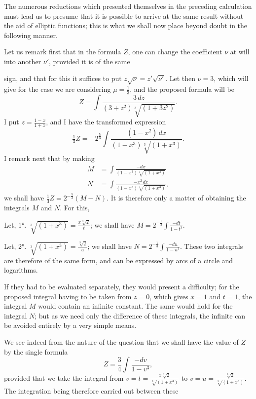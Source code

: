 \documentclass{article}
\begin{document}
The numerous reductions which presented themselves in the preceding calculation must lead us to presume that it is possible to arrive at the same result without the aid of elliptic functions; this is what we shall now place beyond doubt in the following manner.

Let us remark first that in the formula $Z$, one can change the coefficient $\nu$ at will into another $\nu'$, provided it is of the same

sign, and that for this it suffices to put $z\sqrt{\nu}=z'\sqrt{\nu'}$. Let then $\nu=3$, which will give for the case we are considering $\mu=\frac{1}{3}$, and the proposed formula will be
\[ Z=\int\frac{3\,dz}{(3+z^{2})\sqrt[3]{(1+3z^{2})}}. \]
I put $z=\frac{1-x}{1+x}$, and I have the transformed expression
\[ \tfrac{1}{3}Z=-2^{\frac{5}{3}}\int\frac{(1-x^{2})\,dx}{(1-x^{3})\sqrt[3]{(1+x^{3})}}. \]
I remark next that by making
\[ \begin{aligned} M&=\int\frac{-dx}{(1-x^{3})\sqrt[3]{(1+x^{3})}}\\ N&=\int\frac{-x^{2}\,dx}{(1-x^{3})\sqrt[3]{(1+x^{3})}}, \end{aligned} \]
we shall have $\frac{1}{3}Z=2^{-\frac{5}{3}}(M-N)$. It is therefore only a matter of obtaining the integrals $M$ and $N$. For this,

Let, 1°. $\sqrt[3]{(1+x^{3})}=\frac{x\sqrt[3]{2}}{t}$; we shall have $M=2^{-\frac{1}{3}}\displaystyle\int\frac{-dt}{1-t^{3}}$.

Let, 2°. $\sqrt[3]{(1+x^{3})}=\frac{\sqrt[3]{2}}{u}$; we shall have $N=2^{-\frac{1}{3}}\displaystyle\int\frac{-du}{1-u^{3}}$.
These two integrals are therefore of the same form, and can be expressed by arcs of a circle and logarithms.

If they had to be evaluated separately, they would present a difficulty; for the proposed integral having to be taken from $z=0$, which gives $x=1$ and $t=1$, the integral $M$ would contain an infinite constant. The same would hold for the integral $N$; but as we need only the difference of these integrals, the infinite can be avoided entirely by a very simple means.

We see indeed from the nature of the question that we shall have the value of $Z$ by the single formula
\[ Z=\frac{3}{4}\int\frac{-dv}{1-v^{3}}, \]
provided that we take the integral from $v=t=\frac{x\sqrt[3]{2}}{\sqrt[3]{(1+x^{3})}}$ to $v=u=\frac{\sqrt[3]{2}}{\sqrt[3]{(1+x^{3})}}$. The integration being therefore carried out between these
\end{document}
